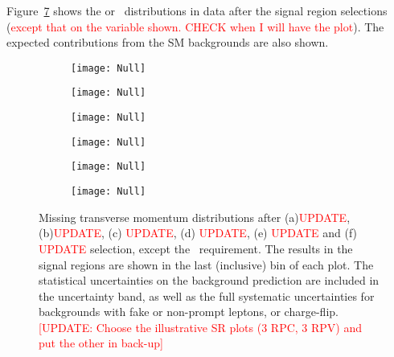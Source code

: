 Figure~\ref{fig:Results_SR} shows the \met or \meff\ distributions in data
after the signal region selections (\textcolor{red}{except that on the variable shown. CHECK when I will have the plot}). 
The expected contributions from the SM backgrounds are also shown. 

\begin{figure}[p]
\centering
\begin{subfigure}[t]{0.49\textwidth}\texttt{[image: Null]}\caption{}\label{fig:Results_SR3L1}\end{subfigure}
\begin{subfigure}[t]{0.49\textwidth}\texttt{[image: Null]}\caption{}\label{fig:Results_SR3L2}\end{subfigure}
\begin{subfigure}[t]{0.49\textwidth}\texttt{[image: Null]}\caption{}\label{fig:Results_SR0b1}\end{subfigure}
\begin{subfigure}[t]{0.49\textwidth}\texttt{[image: Null]}\caption{}\label{fig:Results_SR0b2}\end{subfigure}
\begin{subfigure}[t]{0.49\textwidth}\texttt{[image: Null]}\caption{}\label{fig:Results_SR1b}\end{subfigure}
\begin{subfigure}[t]{0.49\textwidth}\texttt{[image: Null]}\caption{}\label{fig:Results_SR3b}\end{subfigure}
\caption{Missing transverse momentum distributions after (a)\textcolor{red}{UPDATE}, (b)\textcolor{red}{UPDATE}, 
(c) \textcolor{red}{UPDATE}, (d) \textcolor{red}{UPDATE}, (e) \textcolor{red}{UPDATE} and (f) \textcolor{red}{UPDATE} 
selection, except the \met\ requirement. The results in the signal regions are shown in the last (inclusive) bin of each plot. 
The statistical uncertainties on the background prediction are included in the uncertainty band, 
as well as the full systematic uncertainties for backgrounds with fake or non-prompt leptons, or charge-flip. 
\textcolor{red}{[UPDATE: Choose the illustrative SR plots (3 RPC, 3 RPV) and put the other in back-up]}
}
\label{fig:Results_SR} 
\end{figure} 

